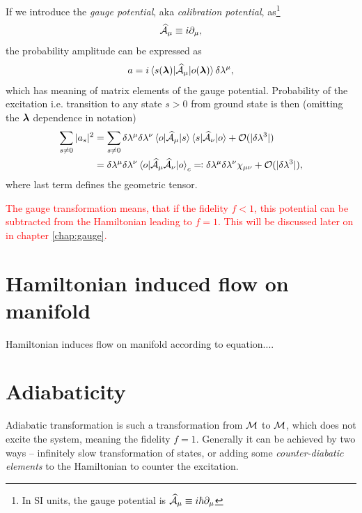 If we introduce the \emph{gauge potential}, aka \emph{calibration potential}, as\footnote{In SI units, the gauge potential is $\AA_\mu\equiv i\hbar\partial_{\mu}$}
\begin{equation}
    \AA_\mu\equiv i\partial_{\mu},
\end{equation}
the probability amplitude can be expressed as
\begin{equation}
   a=i\braket{s(\llambda)|\AA_\mu |o(\llambda)}\delta\lambda^\mu,
   \label{eq:probabilityOfTransitionIsGauge}
\end{equation}
which has meaning of matrix elements of the gauge potential. Probability of the excitation i.e. transition to any state $s>0$ from ground state is then (omitting the $\llambda$ dependence in notation)
\begin{equation}
    \begin{split}
        \sum_{s\neq 0}|a_s|^2&=  \sum_{s\neq 0} \delta \lambda^\mu \delta \lambda^\nu\braket{o|\AA_\mu|s}\braket{s|\AA_\nu|o}+\O(|\delta \lambda^3|) \\
        &= \delta \lambda^\mu \delta \lambda^\nu\braket{o|\AA_\mu \AA_\nu|o}_c\eqqcolon \delta \lambda^\mu \delta \lambda^\nu\chi_{\mu\nu}+\O(|\delta \lambda^3|),
    \end{split}
\end{equation}
where last term defines the geometric tensor.

\textcolor{red}{The gauge transformation means, that if the fidelity $f<1$, this potential can be subtracted from the Hamiltonian leading to $f=1$. This will be discussed later on in chapter \ref{chap:gauge}.}


\section{Hamiltonian induced flow on manifold}
Hamiltonian induces flow on manifold according to \Schrodinger equation....



\newpage





\section{Adiabaticity}
Adiabatic transformation is such a transformation from $\M$ to $\M$, which does not excite the system, meaning the fidelity $f=1$. Generally it can be achieved by two ways -- infinitely slow transformation of states, or adding some \emph{counter-diabatic elements} to the Hamiltonian to counter the excitation.


